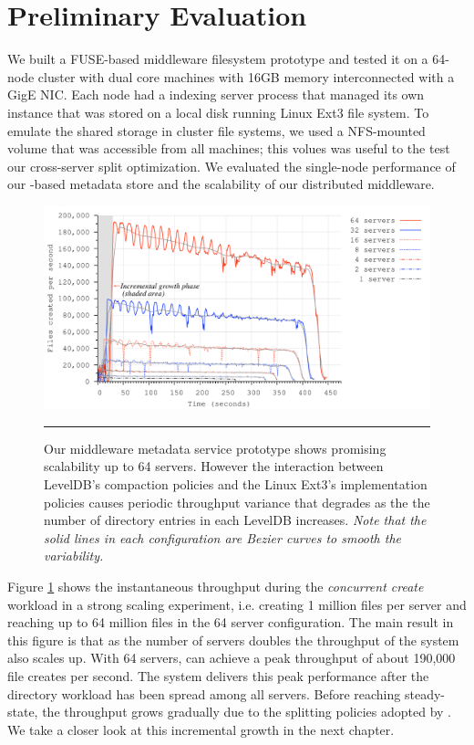 \section{Preliminary Evaluation}

We built a FUSE-based middleware filesystem prototype and tested it on a
64-node cluster with dual core machines with 16GB memory interconnected with a 
GigE NIC.
Each node had a \giga{} indexing server process that managed its own \ldb instance 
that was stored on a local disk running Linux Ext3 file system.
To emulate the shared storage in cluster file systems, we used a NFS-mounted
volume that was accessible from all machines; this volues was useful to the
test our cross-server \ldb split optimization.
We evaluated the single-node performance of our \ldb-based metadata store and
the scalability of our distributed middleware.

\begin{figure}[t]  %
\centerline{\includegraphics[scale=0.33]{./figs/ldb_insertrate}}
\caption{
{\small
Our middleware metadata service prototype shows promising scalability
up to 64 servers. However the interaction between LevelDB's compaction policies and 
the Linux Ext3's implementation policies causes periodic throughput variance
that degrades as the the number of directory entries in each LevelDB
increases. \textit{Note that the solid lines in each configuration are Bezier
curves to smooth the variability.}
}
}
\vspace{15pt}
\hrule 
\label{graph:ldb-scaling}
\end{figure}       %

Figure \ref{graph:ldb-scaling} shows the instantaneous throughput during the 
\textit{concurrent create} workload in a strong scaling experiment, i.e.
creating 1 million files per server and reaching up to 64 million files in the
64 server configuration.
The main result in this figure is that as the number of servers doubles the
throughput of the system also scales up. With 64 servers, \giga{} can achieve a
peak throughput of about 190,000 file creates per second. The system delivers
this peak performance after the directory workload has been spread among all
servers.
Before reaching steady-state, the throughput grows gradually due to the splitting
policies adopted by \giga{}. We take a closer look at this incremental growth in
the next chapter.

